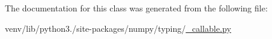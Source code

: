 The documentation for this class was generated from the following file\+:\begin{DoxyCompactItemize}
\item 
venv/lib/python3./site-\/packages/numpy/typing/\hyperlink{__callable_8py}{\+\_\+callable.\+py}\end{DoxyCompactItemize}
